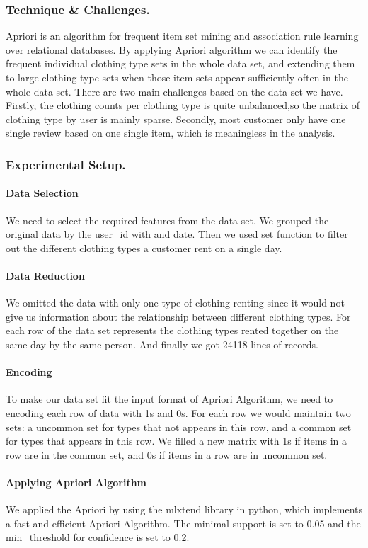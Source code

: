 \documentclass[sigconf]{acmart}
\begin{document}
\subsubsection{Technique \& Challenges.} 
Apriori is an algorithm for frequent item set mining and association rule learning over relational databases. By applying Apriori algorithm we can identify the frequent individual clothing type sets in the whole data set, and extending them to large clothing type sets when those item sets appear sufficiently often in the whole data set.
There are two main challenges based on the data set we have. Firstly, the clothing counts per clothing type is quite unbalanced,so the matrix of clothing type by user is mainly sparse. Secondly, most customer only have one single review based on one single item, which is meaningless in the analysis.

\subsubsection{Experimental Setup.} 
\paragraph{Data Selection}
We need to select the required features from the data set. We grouped the original data by the user\_id with and date. Then we used set function to filter out the different clothing types a customer rent on a single day.
\paragraph{Data Reduction}
We omitted the data with only one type of clothing renting since it would not give us information about the relationship between different clothing types. For each row of the data set represents the clothing types rented together on the same day by the same person. And finally we got 24118 lines of records.
\paragraph{Encoding}
To make our data set fit the input format of Apriori Algorithm, we need to encoding each row of data with 1s and 0s. For each row we would maintain two sets: a uncommon set for types that not appears in this row, and a common set for types that appears in this row. We filled a new matrix with 1s if items in a row are in the common set, and 0s if items in a row are in uncommon set.
\paragraph{Applying Apriori Algorithm}
We applied the Apriori by using the mlxtend library in python, which implements a fast and efficient Apriori Algorithm. The minimal support is set to 0.05 and the min\_threshold for confidence is set to 0.2.
\end{document}
